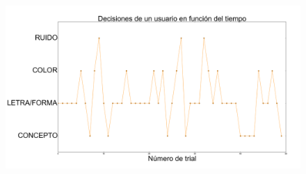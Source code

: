 \documentclass{beamer}
\begin{document}
\begin{frame}
\begin{figure}[h]
\begin{minipage}[c]{1\textwidth}
	\includegraphics[scale=0.108]{user7.png}
  \end{minipage}
\end{figure}
\end{frame}
\end{document}
